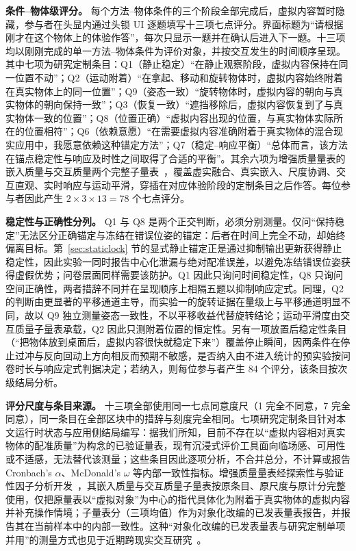\documentclass[review]{vgtc}
\begin{document}
\textbf{条件--物体级评分。} 每个方法--物体条件的三个阶段全部完成后，虚拟内容暂时隐藏，参与者在头显内通过头锁 UI 逐题填写十三项七点评分。界面标题为“请根据刚才在这个物体上的体验作答”，每次只显示一题并在确认后进入下一题。十三项均以刚刚完成的单一方法--物体条件为评价对象，并按交互发生的时间顺序呈现。其中七项为研究定制条目：Q1（静止稳定）“在静止观察阶段，虚拟内容保持在同一位置不动”；Q2（运动附着）“在拿起、移动和旋转物体时，虚拟内容始终附着在真实物体上的同一位置”；Q9（姿态一致）“旋转物体时，虚拟内容的朝向与真实物体的朝向保持一致”；Q3（恢复一致）“遮挡移除后，虚拟内容恢复到了与真实物体一致的位置”；Q8（位置正确）“虚拟内容出现的位置，与真实物体实际所在的位置相符”；Q6（依赖意愿）“在需要虚拟内容准确附着于真实物体的混合现实应用中，我愿意依赖这种锚定方法”；Q7（稳定--响应平衡）“总体而言，该方法在锚点稳定性与响应及时性之间取得了合适的平衡”。其余六项为增强质量量表的嵌入质量与交互质量两个完整子量表~\cite{schein2025aq}，覆盖虚实融合、真实嵌入、尺度协调、交互直观、实时响应与运动平滑，穿插在对应体验阶段的定制条目之后作答。每位参与者因此产生 $2 \times 3 \times 13=78$ 个七点评分。

\textbf{稳定性与正确性分列。} Q1 与 Q8 是两个正交判断，必须分别测量。仅问“保持稳定”无法区分正确锚定与冻结在错误位姿的锚定：后者在时间上完全不动，却始终偏离目标。第~\ref{sec:staticlock} 节的显式静止锚定正是通过抑制输出更新获得静止稳定性，因此实验一同时报告中心化泄漏与绝对配准误差，以避免冻结错误位姿获得虚假优势；问卷层面同样需要该防护。Q1 因此只询问时间稳定性，Q8 只询问空间正确性，两者措辞不同并在呈现顺序上相隔五题以抑制响应定式。同理，Q2 的判断由更显著的平移通道主导，而实验一的旋转证据在量级上与平移通道明显不同，故以 Q9 独立测量姿态一致性，不以平移收益代替旋转结论；运动平滑度由交互质量子量表承载，Q2 因此只测附着位置的恒定性。另有一项放置后稳定性条目（“把物体放到桌面后，虚拟内容很快就稳定下来”）覆盖停止瞬间，因两条件在停止过冲与反向回动上方向相反而预期不敏感，是否纳入由不进入统计的预实验按问卷时长与响应定式判据决定；若纳入，则每位参与者产生 84 个评分，该条目按次级结局分析。

\textbf{评分尺度与条目来源。} 十三项全部使用同一七点同意度尺（1 完全不同意，7 完全同意），同一条目在全部区块中的措辞与刻度完全相同。七项研究定制条目针对本文运行时状态与应用侧结局编写：据我们所知，目前不存在以“虚拟内容相对真实物体的配准质量”为构念的已验证量表，现有沉浸式评价工具面向临场感、可用性或不适感，无法替代该测量；这些条目因此逐项分析，不合并总分，不计算或报告 Cronbach's $\alpha$、McDonald's $\omega$ 等内部一致性指标。增强质量量表经探索性与验证性因子分析开发~\cite{schein2025aq}，其嵌入质量与交互质量子量表按原条目、原尺度与原计分完整使用，仅把原量表以“虚拟对象”为中心的指代具体化为附着于真实物体的虚拟内容并补充操作情境；子量表分（三项均值）作为对象化改编的已发表量表报告，并报告其在当前样本中的内部一致性。这种“对象化改编的已发表量表与研究定制单项并用”的测量方式也见于近期跨现实交互研究~\cite{selfblending2026}。
\end{document}
